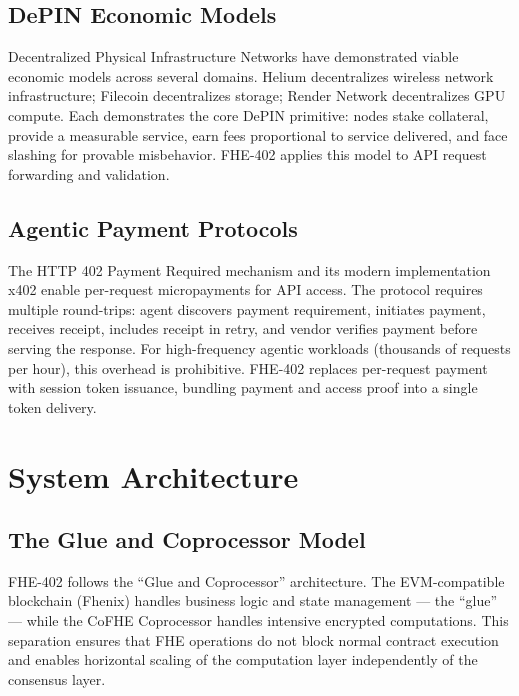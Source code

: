 \documentclass[conference]{IEEEtran}
\begin{document}
\subsection{DePIN Economic Models}
Decentralized Physical Infrastructure Networks have demonstrated viable economic models
across several domains. Helium \cite{helium} decentralizes wireless network infrastructure;
Filecoin \cite{filecoin} decentralizes storage; Render Network \cite{render} decentralizes
GPU compute. Each demonstrates the core DePIN primitive: nodes stake collateral, provide
a measurable service, earn fees proportional to service delivered, and face slashing for
provable misbehavior. FHE-402 applies this model to API request forwarding and validation.

\subsection{Agentic Payment Protocols}
The HTTP 402 Payment Required mechanism and its modern implementation x402 \cite{x402}
enable per-request micropayments for API access. The protocol requires multiple round-trips:
agent discovers payment requirement, initiates payment, receives receipt, includes receipt
in retry, and vendor verifies payment before serving the response. For high-frequency
agentic workloads (thousands of requests per hour), this overhead is prohibitive. FHE-402
replaces per-request payment with session token issuance, bundling payment and access
proof into a single token delivery.

\section{System Architecture}
\label{sec:arch}

\subsection{The Glue and Coprocessor Model}

FHE-402 follows the ``Glue and Coprocessor'' architecture. The EVM-compatible blockchain
(Fhenix) handles business logic and state management --- the ``glue'' ---
while the CoFHE Coprocessor handles intensive encrypted computations. This separation
ensures that FHE operations do not block normal contract execution and enables
horizontal scaling of the computation layer independently of the consensus layer.
\end{document}
